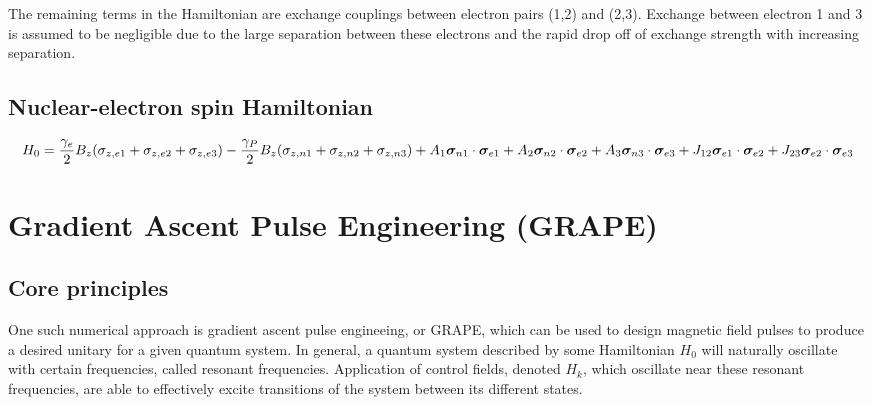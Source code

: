 \documentclass[../Thesis.tex]{subfiles}
\begin{document}
The remaining terms in the Hamiltonian are exchange couplings between electron pairs (1,2) and (2,3). Exchange between electron 1 and 3 is assumed to be negligible due to the large separation between these electrons and the rapid drop off of exchange strength with increasing separation.\cite{wellard_voltage_2004}


\subsection{Nuclear-electron spin Hamiltonian}
\begin{dmath}
    H_0 = \frac{\gamma_e}{2}B_z (\sigma_{z,e1}+\sigma_{z,e2}+\sigma_{z,e3}) - \frac{\gamma_P}{2}B_z(\sigma_{z,n1}+\sigma_{z,n2}+\sigma_{z,n3})\\ + A_1\bm{\sigma}_{n1}\cdot\bm{\sigma}_{e1}+A_2\bm{\sigma}_{n2}\cdot\bm{\sigma}_{e2}+A_3\bm{\sigma}_{n3}\cdot\bm{\sigma}_{e3} + J_{12}\bm{\sigma}_{e1}\cdot\bm{\sigma}_{e2}+J_{23}\bm{\sigma}_{e2}\cdot\bm{\sigma}_{e3}
\end{dmath}


\section{Gradient Ascent Pulse Engineering (GRAPE)}
\subsection{Core principles}
One such numerical approach is gradient ascent pulse engineeing, or GRAPE, which can be used to design magnetic field pulses to produce a desired unitary for a given quantum system\cite{khaneja_optimal_2005,rowland_implementing_2012}. In general, a quantum system described by some Hamiltonian $H_0$ will naturally oscillate with certain frequencies, called resonant frequencies. Application of control fields, denoted $H_k$, which oscillate near these resonant frequencies, are able to effectively excite transitions of the system between its different states. 
\end{document}
